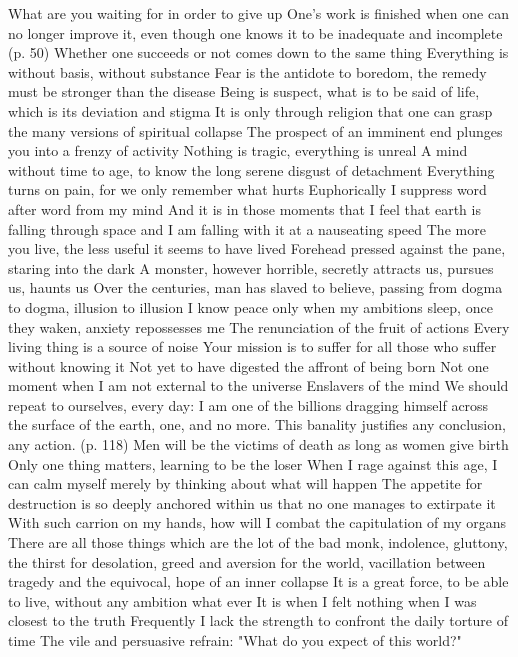 \documentclass{article}
\begin{document}
What are you waiting for in order to give up
One's work is finished when one can no longer improve it, even though one knows it to be inadequate and incomplete (p. 50)
Whether one succeeds or not comes down to the same thing
Everything is without basis, without substance
Fear is the antidote to boredom, the remedy must be stronger than the disease
Being is suspect, what is to be said of life, which is its deviation and stigma
It is only through religion that one can grasp the many versions of spiritual collapse
The prospect of an imminent end plunges you into a frenzy of activity
Nothing is tragic, everything is unreal
A mind without time to age, to know the long serene disgust of detachment
Everything turns on pain, for we only remember what hurts
Euphorically I suppress word after word from my mind
And it is in those moments that I feel that earth is falling through space and I am falling with it at a nauseating speed
The more you live, the less useful it seems to have lived
Forehead pressed against the pane, staring into the dark
A monster, however horrible, secretly attracts us, pursues us, haunts us
Over the centuries, man has slaved to believe, passing from dogma to dogma, illusion to illusion
I know peace only when my ambitions sleep, once they waken, anxiety repossesses me
The renunciation of the fruit of actions
Every living thing is a source of noise
Your mission is to suffer for all those who suffer without knowing it
Not yet to have digested the affront of being born
Not one moment when I am not external to the universe
Enslavers of the mind
We should repeat to ourselves, every day: I am one of the billions dragging himself across the surface of the earth, one, and no more. This banality justifies any conclusion, any action. (p. 118)
Men will be the victims of death as long as women give birth
Only one thing matters, learning to be the loser
When I rage against this age, I can calm myself merely by thinking about what will happen
The appetite for destruction is so deeply anchored within us that no one manages to extirpate it
With such carrion on my hands, how will I combat the capitulation of my organs
There are all those things which are the lot of the bad monk, indolence, gluttony, the thirst for desolation, greed and aversion for the world, vacillation between tragedy and the equivocal, hope of an inner collapse
It is a great force, to be able to live, without any ambition what ever
It is when I felt nothing when I was closest to the truth
Frequently I lack the strength to confront the daily torture of time
The vile and persuasive refrain: "What do you expect of this world?"
\end{document}

